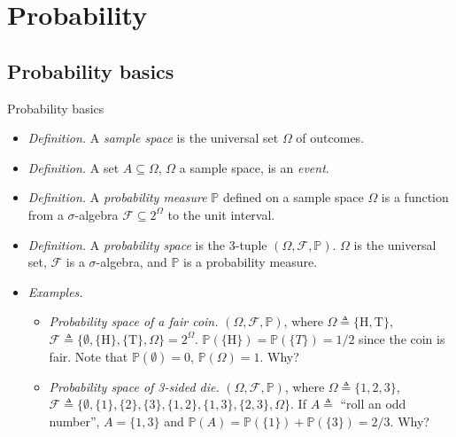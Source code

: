 \documentclass{beamer}
\numberwithin{equation}{section}
\begin{document}
\section{Probability}

\subsection{Probability basics}

\begin{frame}{Probability basics}
    \begin{itemize}
        \item
        \textit{Definition.} A \textit{sample space} is the universal set
        $ \Omega $ of outcomes.

        \item
        \textit{Definition.} A set $ A \subseteq \Omega $, $ \Omega $ a sample
        space, is an \textit{event}.

        \item
        \textit{Definition.} A \textit{probability measure} $ \mathbb{P} $
        defined on a sample space $ \Omega $ is a function from a
        $ \sigma $-algebra $ \mathcal{F} \subseteq 2^\Omega $ to the unit
        interval.

        \item
        \textit{Definition.} A \textit{probability space} is the 3-tuple
        $ (\Omega, \mathcal{F}, \mathbb{P}) $. $ \Omega $ is the universal set,
        $ \mathcal{F} $ is a $ \sigma $-algebra, and $ \mathbb{P} $ is a
        probability measure.

        \item
        \textit{Examples.}
        \begin{itemize}
            \item
            \textit{Probability space of a fair coin.}
            $ (\Omega, \mathcal{F}, \mathbb{P}) $, where $ \Omega \triangleq
            \{\text{H}, \text{T}\} $, $ \mathcal{F} \triangleq \{\emptyset,
            \{\text{H}\}, \{\text{T}\}, \Omega\} = 2^\Omega $.
            $ \mathbb{P}(\{\text{H}\}) = \mathbb{P}(\{T\}) = 1 / 2 $ since the
            coin is fair. Note that $ \mathbb{P}(\emptyset) = 0 $,
            $ \mathbb{P}(\Omega) = 1 $. Why?

            \item
            \textit{Probability space of 3-sided die.} $ (\Omega, \mathcal{F},
            \mathbb{P}) $, where $ \Omega \triangleq \{1, 2, 3\} $,
            $ \mathcal{F} \triangleq \{\emptyset, \{1\}, \{2\}, \{3\},
            \{1, 2\}, \{1, 3\}, \{2, 3\}, \Omega\} $. If $ A \triangleq $
            ``roll an odd number'', $ A = \{1, 3\} $ and
            $ \mathbb{P}(A) = \mathbb{P}(\{1\}) + \mathbb{P}(\{3\}) = 2 / 3 $.
            Why?
        \end{itemize}
    \end{itemize}
\end{frame}
\end{document}
